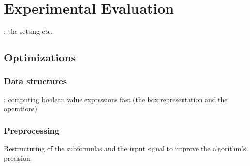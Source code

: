 \section{Experimental Evaluation}

\TODO: the setting etc.

\subsection{Optimizations}

\subsubsection{Data structures}

\TODO: computing boolean value expressions fast (the box representation and the operations)

\subsubsection{Preprocessing}

Restructuring of the subformulas and the input signal to improve the algorithm's 
precision.

